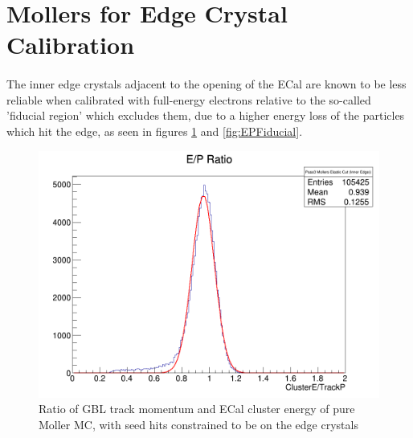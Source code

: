 \documentclass{article}
\begin{document}
	\section{Mollers for Edge Crystal Calibration}
	\paragraph{}
	The inner edge crystals adjacent to the opening of the ECal are known to be less reliable when calibrated with full-energy electrons relative to the so-called 'fiducial region' which excludes them, due to a higher energy loss of the particles which hit the edge, as seen in figures \ref{fig:EPEdge} and \ref{fig:EPFiducial}. 
	
	\begin{figure}[H]
  	\includegraphics[width=\linewidth]{PostCollabMeet/Pass3PureMoller/EDGE_MollerEPRatio.png}
  	\caption{Ratio of GBL track momentum and ECal cluster energy of pure Moller MC, with seed hits constrained to be on the edge crystals}
  	\label{fig:EPEdge}
	\end{figure}
	
\end{document}
